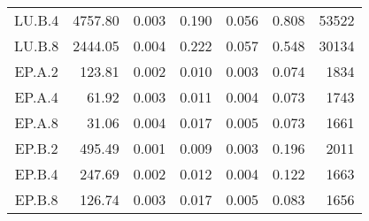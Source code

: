 \documentclass[../Main/thesis.tex]{subfiles}
\begin{document}
\begin{longtable}[c]{c*{6}{r}}
  LU.B.4                       & 4757.80                      & 0.003                        & 0.190                      & 0.056                        & 0.808 & 53522  \\
  LU.B.8                       & 2444.05                      & 0.004                        & 0.222                      & 0.057                        & 0.548 & 30134  \\
  EP.A.2                       & 123.81                       & 0.002                        & 0.010                      & 0.003                        & 0.074 & 1834   \\
  EP.A.4                       & 61.92                        & 0.003                        & 0.011                      & 0.004                        & 0.073 & 1743   \\
  EP.A.8                       & 31.06                        & 0.004                        & 0.017                      & 0.005                        & 0.073 & 1661   \\
  EP.B.2                       & 495.49                       & 0.001                        & 0.009                      & 0.003                        & 0.196 & 2011   \\
  EP.B.4                       & 247.69                       & 0.002                        & 0.012                      & 0.004                        & 0.122 & 1663   \\
  EP.B.8                       & 126.74                       & 0.003                        & 0.017                      & 0.005                        & 0.083 & 1656   \\
  \bottomrule[1.5pt]
\end{longtable}
\end{document}
